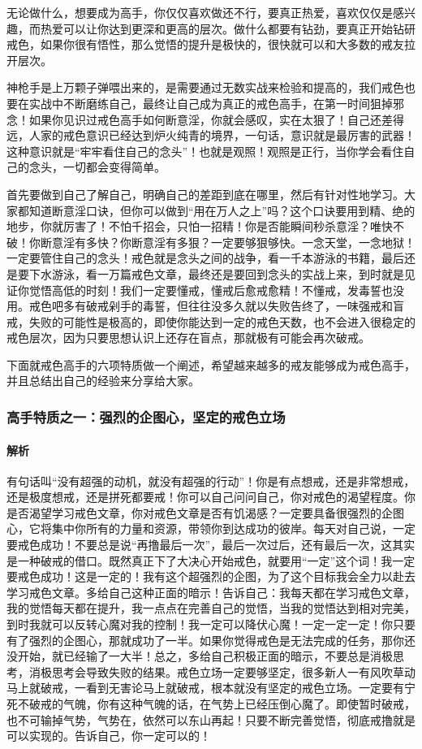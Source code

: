无论做什么，想要成为高手，你仅仅喜欢做还不行，要真正热爱，喜欢仅仅是感兴趣，而热爱可以让你达到更深和更高的层次。做什么都要有钻劲，要真正开始钻研戒色，如果你很有悟性，那么觉悟的提升是极快的，很快就可以和大多数的戒友拉开层次。

神枪手是上万颗子弹喂出来的，是需要通过无数实战来检验和提高的，我们戒色也要在实战中不断磨练自己，最终让自己成为真正的戒色高手，在第一时间狙掉邪念！如果你见识过戒色高手如何断意淫，你就会感叹，实在太狠了！自己还差得远，人家的戒色意识已经达到炉火纯青的境界，一句话，意识就是最厉害的武器！这种意识就是“牢牢看住自己的念头”！也就是观照！观照是正行，当你学会看住自己的念头，一切都会变得简单。

首先要做到自己了解自己，明确自己的差距到底在哪里，然后有针对性地学习。大家都知道断意淫口诀，但你可以做到“用在万人之上”吗？这个口诀要用到精、绝的地步，你就厉害了！不怕千招会，只怕一招精！你是否能瞬间秒杀意淫？唯快不破！你断意淫有多快？你断意淫有多狠？一定要够狠够快。一念天堂，一念地狱！一定要管住自己的念头！戒色就是念头之间的战争，看一千本游泳的书籍，最后还是要下水游泳，看一万篇戒色文章，最终还是要回到念头的实战上来，到时就是见证你觉悟高低的时刻！我们一定要懂戒，懂戒后愈戒愈精！不懂戒，发毒誓也没用。戒色吧多有破戒剁手的毒誓，但往往没多久就以失败告终了，一味强戒和盲戒，失败的可能性是极高的，即使你能达到一定的戒色天数，也不会进入很稳定的戒色层次，因为只要思想认识上还存在盲点，那就极有可能会再次破戒。

下面就戒色高手的六项特质做一个阐述，希望越来越多的戒友能够成为戒色高手，并且总结出自己的经验来分享给大家。

\subsubsection{高手特质之一：强烈的企图心，坚定的戒色立场}

\paragraph{解析} 有句话叫“没有超强的动机，就没有超强的行动”！你是有点想戒，还是非常想戒，还是极度想戒，还是拼死都要戒！你可以自己问问自己，你对戒色的渴望程度。你是否渴望学习戒色文章，你对戒色文章是否有饥渴感？一定要具备很强烈的企图心，它将集中你所有的力量和资源，带领你到达成功的彼岸。每天对自己说，一定要戒色成功！不要总是说“再撸最后一次”，最后一次过后，还有最后一次，这其实是一种破戒的借口。既然真正下了大决心开始戒色，就要用“一定”这个词！我一定要戒色成功！这是一定的！我有这个超强烈的企图，为了这个目标我会全力以赴去学习戒色文章。多给自己这种正面的暗示！告诉自己：我每天都在学习戒色文章，我的觉悟每天都在提升，我一点点在完善自己的觉悟，当我的觉悟达到相对完美，到时我就可以反转心魔对我的控制！我一定可以降伏心魔！一定一定一定！你只要有了强烈的企图心，那就成功了一半。如果你觉得戒色是无法完成的任务，那你还没开始，就已经输了一大半！总之，多给自己积极正面的暗示，不要总是消极思考，消极思考会导致失败的结果。戒色立场一定要够坚定，很多新人一有风吹草动马上就破戒，一看到无害论马上就破戒，根本就没有坚定的戒色立场。一定要有宁死不破戒的气魄，你有这种气魄的话，在气势上已经压倒心魔了。即使暂时破戒，也不可输掉气势，气势在，依然可以东山再起！只要不断完善觉悟，彻底戒撸就是可以实现的。告诉自己，你一定可以的！

